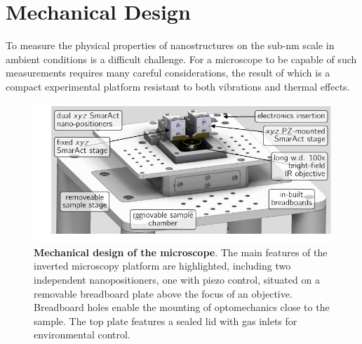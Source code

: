 \documentclass{article}
\begin{document}
\section{Mechanical Design}

To measure the physical properties of nanostructures on the sub-nm scale in ambient conditions is a difficult challenge. For a microscope to be capable of such measurements requires many careful considerations, the result of which is a compact experimental platform resistant to both vibrations and thermal effects.

\begin{figure}[tb]
\centering
\includegraphics[clip=true, trim=15 10 0 0]{figures/microscope_stage_design}
\caption[Mechanical design of the microscope]{\textbf{Mechanical design of the microscope}. The main features of the inverted microscopy platform are highlighted, including two independent nanopositioners, one with piezo control, situated on a removable breadboard plate above the focus of an objective. Breadboard holes enable the mounting of optomechanics close to the sample. The top plate features a sealed lid with gas inlets for environmental control.}
\label{fig:mechanical_design}
\end{figure}
\end{document}
